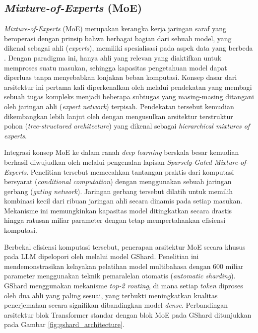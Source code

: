 \subsection{\textit{Mixture-of-Experts} (MoE)}
\textit{Mixture-of-Experts} (MoE) merupakan kerangka kerja jaringan saraf yang beroperasi dengan prinsip bahwa berbagai bagian dari sebuah model, yang dikenal sebagai ahli (\textit{experts}), memiliki spesialisasi pada aspek data yang berbeda \parencite{caiSurveyMixtureExperts2025}. Dengan paradigma ini, hanya ahli yang relevan yang diaktifkan untuk memproses suatu masukan, sehingga kapasitas pengetahuan model dapat diperluas tanpa menyebabkan lonjakan beban komputasi. Konsep dasar dari arsitektur ini pertama kali diperkenalkan oleh \textcite{jacobsAdaptiveMixturesLocal1991} melalui pendekatan yang membagi sebuah tugas kompleks menjadi beberapa subtugas yang masing-masing ditangani oleh jaringan ahli (\textit{expert network}) terpisah. Pendekatan tersebut kemudian dikembangkan lebih lanjut oleh \textcite{jordanHierarchicalMixturesExperts1993} dengan mengusulkan arsitektur terstruktur pohon (\textit{tree-structured architecture}) yang dikenal sebagai \textit{hierarchical mixtures of experts}. 

Integrasi konsep MoE ke dalam ranah \textit{deep learning} berskala besar kemudian berhasil diwujudkan oleh \textcite{shazeerOutrageouslyLargeNeural2017} melalui pengenalan lapisan \textit{Sparsely-Gated Mixture-of-Experts}. Penelitian tersebut memecahkan tantangan praktis dari komputasi bersyarat (\textit{conditional computation}) dengan menggunakan sebuah jaringan gerbang (\textit{gating network}). Jaringan gerbang tersebut dilatih untuk memilih kombinasi kecil dari ribuan jaringan ahli secara dinamis pada setiap masukan. Mekanisme ini memungkinkan kapasitas model ditingkatkan secara drastis hingga ratusan miliar parameter dengan tetap mempertahankan efisiensi komputasi.

Berbekal efisiensi komputasi tersebut, penerapan arsitektur MoE secara khusus pada LLM dipelopori oleh \textcite{lepikhinGShardScalingGiant2020} melalui model GShard. Penelitian ini mendemonstrasikan kelayakan pelatihan model multibahasa dengan 600 miliar parameter menggunakan teknik pemaralelan otomatis (\textit{automatic sharding}). GShard menggunakan mekanisme \textit{top-2 routing}, di mana setiap \textit{token} diproses oleh dua ahli yang paling sesuai, yang terbukti meningkatkan kualitas penerjemahan secara signifikan dibandingkan model \textit{dense}. Perbandingan arsitektur blok Transformer standar dengan blok MoE pada GShard ditunjukkan pada Gambar \ref{fig:gshard_architecture}.

